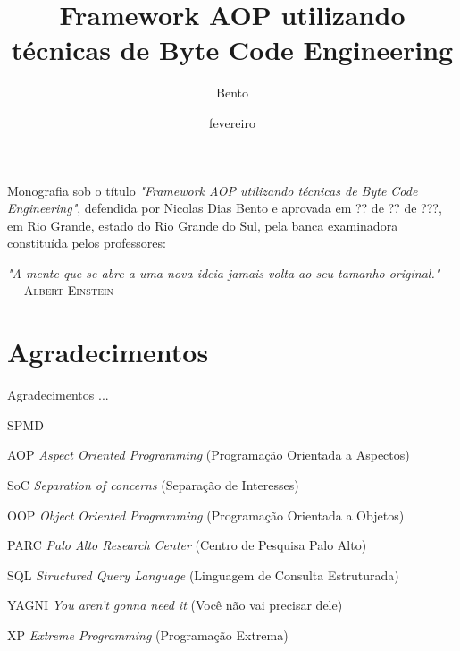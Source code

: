 \documentclass[tc,openright]{iiufrgs}
\title{Framework AOP utilizando técnicas de Byte Code Engineering}
\author{Bento}{Nicolas}
\date{fevereiro}{2014}
\begin{document}
\maketitle

\begin{folhadeaprovacao}
Monografia sob o título \textit{"Framework AOP utilizando técnicas de Byte Code Engineering"}, defendida por Nicolas Dias Bento e aprovada em ?? de ?? de ???, em Rio Grande, estado do Rio Grande do Sul, pela banca examinadora constituída pelos professores:
\end{folhadeaprovacao}

\clearpage

\begin{flushright}
\mbox{}\vfill
{\sffamily\itshape
"A mente que se abre a uma nova ideia jamais volta ao seu tamanho original."\\}
--- \textsc{Albert Einstein}
\end{flushright}

\chapter*{Agradecimentos}

Agradecimentos ...

\tableofcontents

\begin{listofabbrv}{SPMD}
	\item[AOP] \textit{Aspect Oriented Programming} (Programação Orientada a Aspectos)
	\item[SoC] \textit{Separation of concerns} (Separação de Interesses)
	\item[OOP] \textit{Object Oriented Programming} (Programação Orientada a Objetos)
	\item[PARC] \textit{Palo Alto Research Center} (Centro de Pesquisa Palo Alto) 
	\item[SQL] \textit{Structured Query Language} (Linguagem de Consulta Estruturada)
	\item[YAGNI] \textit{You aren’t gonna need it} (Você não vai precisar dele)
	\item[XP] \textit{Extreme Programming} (Programação Extrema)
\end{listofabbrv}
\end{document}
